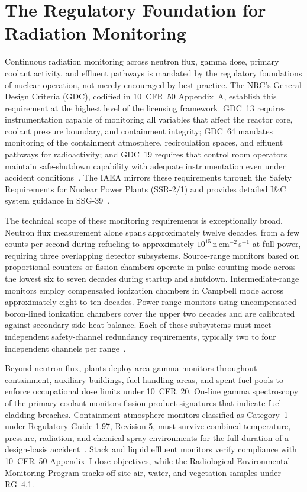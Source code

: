 \section{The Regulatory Foundation for Radiation Monitoring}

Continuous radiation monitoring across neutron flux, gamma dose, primary
coolant activity, and effluent pathways is mandated by the regulatory
foundations of nuclear operation, not merely encouraged by best practice.
The NRC's General Design Criteria (GDC), codified in 10~CFR~50 Appendix~A,
establish this requirement at the highest level of the licensing framework.
GDC~13 requires instrumentation capable of monitoring all variables that
affect the reactor core, coolant pressure boundary, and containment integrity;
GDC~64 mandates monitoring of the containment atmosphere, recirculation
spaces, and effluent pathways for radioactivity; and GDC~19 requires that
control room operators maintain safe-shutdown capability with adequate
instrumentation even under accident conditions~\cite{NRC_GDC_2023}. The IAEA
mirrors these requirements through the Safety Requirements for Nuclear
Power Plants (SSR-2/1) and provides detailed I\&C system
guidance in SSG-39~\cite{IAEA_SSR21, IAEA_SSG39}.

The technical scope of these monitoring requirements is exceptionally broad. Neutron
flux measurement alone spans approximately twelve decades, from a few counts
per second during refueling to approximately $10^{15}$\,n\,cm$^{-2}$\,s$^{-1}$
at full power, requiring three overlapping detector subsystems. Source-range
monitors based on proportional counters or fission chambers operate in
pulse-counting mode across the lowest six to seven decades during startup and
shutdown. Intermediate-range monitors employ compensated ionization chambers
in Campbell mode across approximately eight to ten decades. Power-range
monitors using uncompensated boron-lined ionization chambers cover the upper
two decades and are calibrated against secondary-side heat balance. Each of
these subsystems must meet independent safety-channel redundancy requirements,
typically two to four independent channels per range~\cite{NucPower_Excore}.

Beyond neutron flux, plants deploy area gamma monitors throughout containment,
auxiliary buildings, fuel handling areas, and spent fuel pools to enforce
occupational dose limits under 10~CFR~20. On-line gamma spectroscopy of the
primary coolant monitors fission-product signatures that indicate
fuel-cladding breaches. Containment atmosphere monitors classified as
Category~1 under Regulatory Guide 1.97, Revision 5, must survive combined
temperature, pressure, radiation, and chemical-spray environments for the
full duration of a design-basis accident~\cite{NRC_RG197_2018}. Stack and
liquid effluent monitors verify compliance with 10~CFR~50 Appendix~I dose
objectives, while the Radiological Environmental Monitoring Program tracks
off-site air, water, and vegetation samples under RG~4.1.

